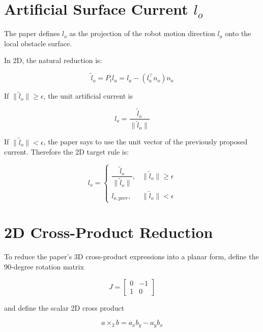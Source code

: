 \documentclass[11pt]{article}
\begin{document}
\section*{Artificial Surface Current \(l_o\)}

The paper defines \(l_o\) as the projection of the robot motion direction
\(l_a\) onto the local obstacle surface.

In 2D, the natural reduction is:

\begin{equation}
\tilde{l}_o = P_t l_a = l_a - (l_a^\top n_o)n_o
\end{equation}

If \(\lVert \tilde{l}_o \rVert \ge \epsilon\), the unit artificial current is

\begin{equation}
l_o = \frac{\tilde{l}_o}{\lVert \tilde{l}_o \rVert}
\end{equation}

If \(\lVert \tilde{l}_o \rVert < \epsilon\), the paper says to use the unit
vector of the previously proposed current. Therefore the 2D target rule is:

\begin{equation}
l_o =
\begin{cases}
\dfrac{\tilde{l}_o}{\lVert \tilde{l}_o \rVert}, & \lVert \tilde{l}_o \rVert \ge \epsilon \\
l_{o,\text{prev}}, & \lVert \tilde{l}_o \rVert < \epsilon
\end{cases}
\end{equation}

\section*{2D Cross-Product Reduction}

To reduce the paper's 3D cross-product expressions into a planar form, define
the 90-degree rotation matrix

\begin{equation}
J =
\begin{bmatrix}
0 & -1 \\
1 & 0
\end{bmatrix}
\end{equation}

and define the scalar 2D cross product

\begin{equation}
a \times_2 b = a_x b_y - a_y b_x
\end{equation}
\end{document}

